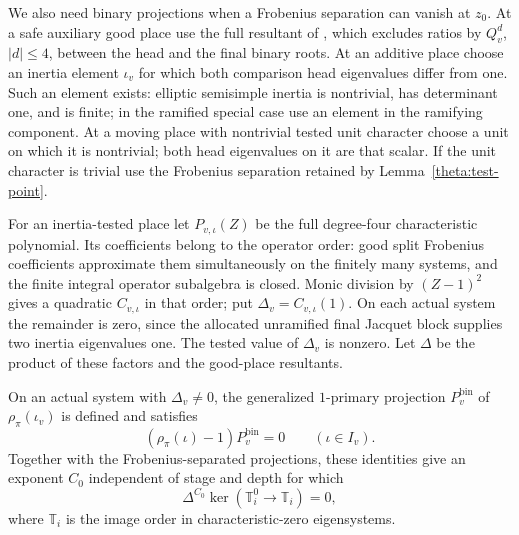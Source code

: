 We also need binary projections when a Frobenius separation can
vanish at $z_0$.  At a safe auxiliary good place use the full
resultant of \cite[equation~(8.10)]{C}, which excludes ratios by
$Q_v^d$, $|d|\leq4$, between the head and the final binary roots.
At an additive place choose an inertia element $\iota_v$ for
which both comparison head eigenvalues differ from one.  Such
an element exists: elliptic semisimple inertia is nontrivial,
has determinant one, and is finite; in the ramified special
case use an element in the ramifying component.  At a moving
place with nontrivial tested unit character choose a unit on
which it is nontrivial; both head eigenvalues on it are that
scalar.  If the unit character is trivial use the Frobenius
separation retained by Lemma~\ref{theta:test-point}.

For an inertia-tested place let $P_{v,\iota}(Z)$ be the full
degree-four characteristic polynomial.  Its coefficients belong
to the operator order: good split Frobenius coefficients
approximate them simultaneously on the finitely many systems,
and the finite integral operator subalgebra is closed.  Monic
division by $(Z-1)^2$ gives a quadratic $C_{v,\iota}$ in that
order; put $\Delta_v=C_{v,\iota}(1)$.  On each actual system
the remainder is zero, since the allocated unramified final
Jacquet block supplies two inertia eigenvalues one.  The tested
value of $\Delta_v$ is nonzero.  Let $\Delta$ be the product of
these factors and the good-place resultants.

\begin{lemma}
\label{extraction:binary}
On an actual system with $\Delta_v\ne0$, the generalized
$1$-primary projection $P_v^{\mathrm{bin}}$ of
$\rho_\pi(\iota_v)$ is defined and satisfies
\[
                (\rho_\pi(\iota)-1)P_v^{\mathrm{bin}}=0
                           \qquad(\iota\in I_v).
\]
Together with the Frobenius-separated projections, these identities
give an exponent $C_0$ independent of stage and depth for which
\[
 \Delta^{C_0}\ker(\mathbb T_i^0\longrightarrow\mathbb T_i)=0,
\]
where $\mathbb T_i$ is the image order in characteristic-zero
eigensystems.
\end{lemma}

